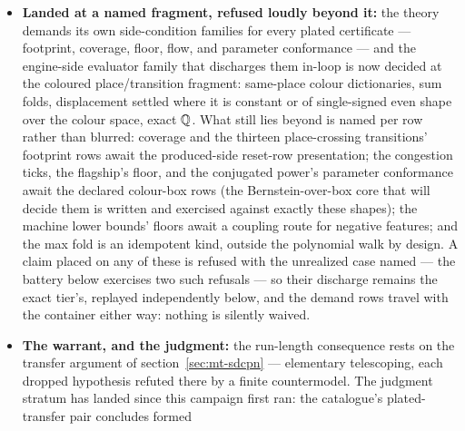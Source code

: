 \begin{itemize}
  containers that claim nothing (a vacuous accept is structurally
  unavailable, and the battery below includes the probe). Since the
  evaluator family reached the coloured tier, the same in-loop walk
  also discharges the plated side-condition claims the container
  now carries: footprint on the thirty-six tick rows --- the
  flagship's six, whose colour-typed feature dictionaries are read
  and decided from the container's own bytes, the lot count's six,
  the machine conservations' twelve, and the deadline pair's twelve
  --- flow on all twelve
  certificates, and the five floor claims the sign analysis reaches,
  with zero refusals and zero failures on the real emission; a
  standalone checker binary consuming the same sealed bytes reports
  identical tallies.
\item \textbf{Landed at a named fragment, refused loudly beyond it:}
  the theory demands its own side-condition families for every
  plated certificate --- footprint, coverage, floor, flow, and
  parameter conformance --- and the engine-side evaluator family
  that discharges them in-loop is now decided at the coloured
  place/transition fragment: same-place colour dictionaries, sum
  folds, displacement settled where it is constant or of
  single-signed even shape over the colour space, exact $\mathbb{Q}$. What
  still lies beyond is named per row rather than blurred: coverage
  and the thirteen place-crossing transitions' footprint rows await the
  produced-side reset-row presentation; the congestion ticks, the
  flagship's floor, and the conjugated power's parameter conformance
  await the declared colour-box rows (the Bernstein-over-box core
  that will decide them is written and exercised against exactly
  these shapes); the machine lower bounds' floors await a coupling
  route for negative features; and the max fold is an idempotent
  kind, outside the polynomial walk by design. A claim placed on
  any of these is refused with the unrealized case named --- the
  battery below exercises two such refusals --- so their discharge
  remains the exact tier's, replayed independently below, and the
  demand rows travel with the container either way: nothing is
  silently waived.
\item \textbf{The warrant, and the judgment:} the run-length
  consequence rests on the transfer argument of
  section~\ref{sec:mt-sdcpn} --- elementary telescoping, each
  dropped hypothesis refuted there by a finite countermodel. The
  judgment stratum has landed since this campaign first ran: the
  catalogue's plated-transfer pair concludes formed

\end{itemize}
